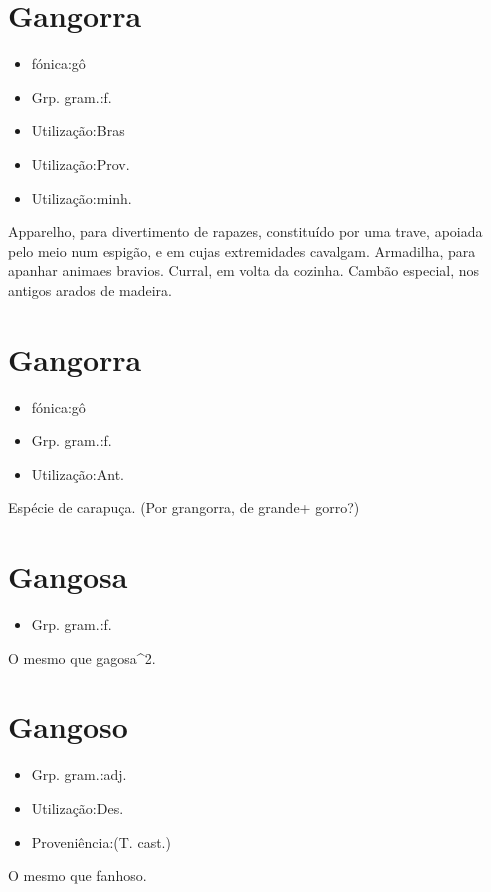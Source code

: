 \section{Gangorra}
\begin{itemize}
\item {fónica:gô}
\end{itemize}
\begin{itemize}
\item {Grp. gram.:f.}
\end{itemize}
\begin{itemize}
\item {Utilização:Bras}
\end{itemize}
\begin{itemize}
\item {Utilização:Prov.}
\end{itemize}
\begin{itemize}
\item {Utilização:minh.}
\end{itemize}
Apparelho, para divertimento de rapazes, constituído por uma trave, apoiada pelo meio num espigão, e em cujas extremidades cavalgam.
Armadilha, para apanhar animaes bravios.
Curral, em volta da cozinha.
Cambão especial, nos antigos arados de madeira.
\section{Gangorra}
\begin{itemize}
\item {fónica:gô}
\end{itemize}
\begin{itemize}
\item {Grp. gram.:f.}
\end{itemize}
\begin{itemize}
\item {Utilização:Ant.}
\end{itemize}
Espécie de carapuça.
(Por \textunderscore grangorra\textunderscore , de \textunderscore grande\textunderscore  + \textunderscore gorro\textunderscore ?)
\section{Gangosa}
\begin{itemize}
\item {Grp. gram.:f.}
\end{itemize}
O mesmo que \textunderscore gagosa\textunderscore ^2.
\section{Gangoso}
\begin{itemize}
\item {Grp. gram.:adj.}
\end{itemize}
\begin{itemize}
\item {Utilização:Des.}
\end{itemize}
\begin{itemize}
\item {Proveniência:(T. cast.)}
\end{itemize}
O mesmo que \textunderscore fanhoso\textunderscore .
